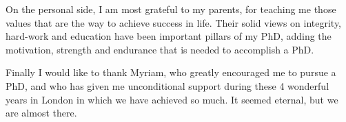 On the personal side, I am most grateful to my parents, for teaching me those values that are the way to achieve success in life. Their solid views on integrity, hard-work and education have been important pillars of my PhD, adding the motivation, strength and endurance that is needed to accomplish a PhD.

Finally I would like to thank Myriam, who greatly encouraged me to pursue a PhD, and who has given me unconditional support during these 4 wonderful years in London in which we have achieved so much. It seemed eternal, but we are almost there.


\endgroup



